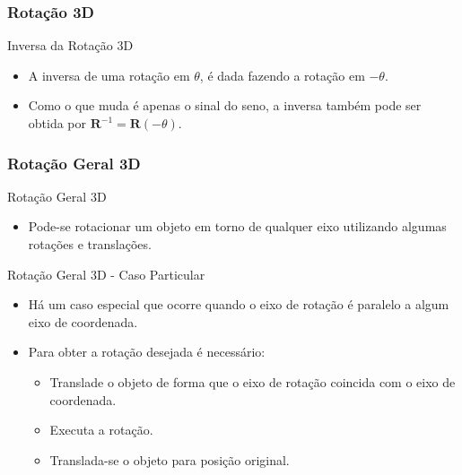 \documentclass{beamer}
\begin{document}
\begin{frame}
\frametitle{Rotação 3D}

	\begin{block}{Inversa da Rotação 3D}
		\begin{itemize}
			\item A inversa de uma rotação em $\theta$, é dada fazendo a rotação em $-\theta$.
			\item Como o que muda é apenas o sinal do seno, a inversa também pode ser obtida por $\textbf{R}^{-1} = \textbf{R}(-\theta)$.
		\end{itemize}
	\end{block}
	
\end{frame}


\begin{frame}
\frametitle{Rotação Geral 3D}

	\begin{block}{Rotação Geral 3D}
		\begin{itemize}
			\item Pode-se rotacionar um objeto em torno de qualquer eixo utilizando algumas rotações e translações.
		\end{itemize}
	\end{block}
	
	\begin{block}{Rotação Geral 3D - Caso Particular}
		\begin{itemize}
			\item Há um caso especial que ocorre quando o eixo de rotação é paralelo a algum eixo de coordenada.
			\item Para obter a rotação desejada é necessário:
				\begin{itemize}
					\item Translade o objeto de forma que o eixo de rotação coincida com o eixo de coordenada.
					\item Executa a rotação.
					\item Translada-se o objeto para posição original.
				\end{itemize}
		\end{itemize}
	\end{block}
	
\end{frame}
\end{document}
